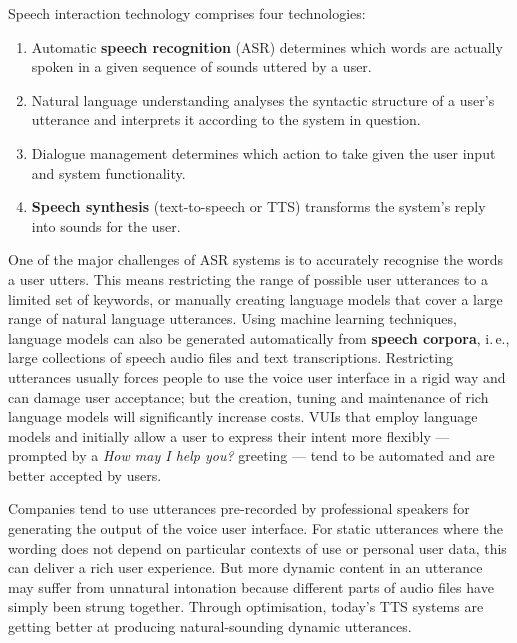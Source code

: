 \begin{multicols}{2}
Speech interaction technology comprises four technologies: 

\begin{enumerate}
\item Automatic \textbf{speech recognition} (ASR) determines which words are actually spoken in a given sequence of sounds uttered by a user.  
\item Natural language understanding analyses the syntactic structure of a user’s utterance and interprets it according to the system in question.
\item Dialogue management determines which action to take given the user input and system functionality.   
\item \textbf{Speech synthesis} (text-to-speech or TTS) transforms the system’s reply into sounds for the user.
\end{enumerate}

One of the major challenges of ASR systems is to accurately recognise the words a user utters. This means restricting the range of possible user utterances to a limited set of keywords, or manually creating language models that cover a large range of natural language utterances. Using machine learning techniques, language models can also be generated automatically from \textbf{speech corpora}, i.\,e., large collections of speech audio files and text transcriptions. Restricting utterances usually forces people to use the voice user interface in a rigid way and can damage user acceptance; but the creation, tuning and maintenance of rich language models will significantly increase costs. VUIs that employ language models and initially allow a user to express their intent more flexibly — prompted by a \textit{How may I help you?} greeting — tend to be automated and are better accepted by users.


Companies tend to use utterances pre-recorded by professional speakers for generating the output of the voice user interface. For static utterances where the wording does not depend on particular contexts of use or personal user data, this can deliver a rich user experience. But more dynamic content in an utterance may suffer from unnatural intonation because different parts of audio files have simply been strung together. Through optimisation, today’s TTS systems are getting better at producing natural-sounding dynamic utterances.


\end{multicols}
